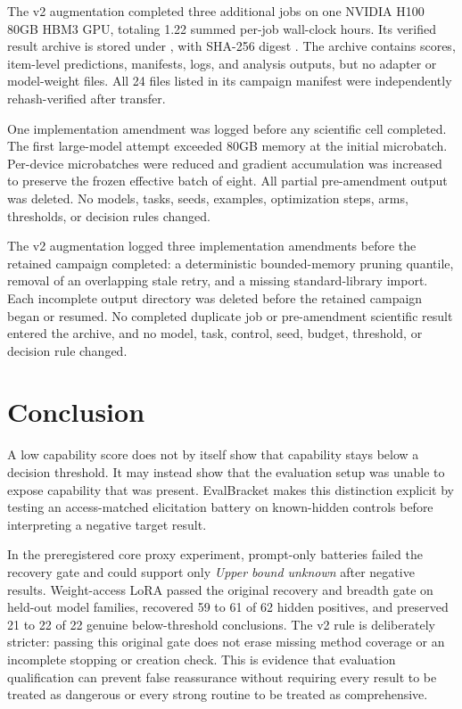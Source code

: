 \documentclass[11pt]{article}
\newcommand{\EB}{EvalBracket}
\newcommand{\Unknown}{\textit{Upper bound unknown}}
\begin{document}
The v2 augmentation completed three additional jobs on one NVIDIA H100 80GB HBM3 GPU, totaling
1.22 summed per-job wall-clock hours. Its verified result archive is stored under
, with SHA-256 digest
\texttt{}.
The archive contains scores, item-level predictions, manifests, logs, and analysis outputs, but no
adapter or model-weight files. All 24 files listed in its campaign manifest were independently
rehash-verified after transfer.

One implementation amendment was logged before any scientific cell completed. The first large-model
attempt exceeded 80GB memory at the initial microbatch. Per-device microbatches were reduced and
gradient accumulation was increased to preserve the frozen effective batch of eight. All partial
pre-amendment output was deleted. No models, tasks, seeds, examples, optimization steps, arms,
thresholds, or decision rules changed.

The v2 augmentation logged three implementation amendments before the retained campaign completed:
a deterministic bounded-memory pruning quantile, removal of an overlapping stale retry, and a
missing standard-library import. Each incomplete output directory was deleted before the retained
campaign began or resumed. No completed duplicate job or pre-amendment scientific result entered the
archive, and no model, task, control, seed, budget, threshold, or decision rule changed.

\section{Conclusion}

A low capability score does not by itself show that capability stays below a decision threshold. It
may instead show that the evaluation setup was unable to expose capability that was present.
\EB{} makes this distinction explicit by testing an access-matched elicitation battery on
known-hidden controls before interpreting a negative target result.

In the preregistered core proxy experiment, prompt-only batteries failed the recovery gate and could
support only \Unknown{} after negative results. Weight-access LoRA passed the original recovery and
breadth gate on held-out model families, recovered 59 to 61 of 62 hidden positives, and preserved 21
to 22 of 22 genuine below-threshold conclusions. The v2 rule is deliberately stricter: passing this
original gate does not erase missing method coverage or an incomplete stopping or creation check.
This is evidence that evaluation qualification can prevent false reassurance without requiring every
result to be treated as dangerous or every strong routine to be treated as comprehensive.
\end{document}
